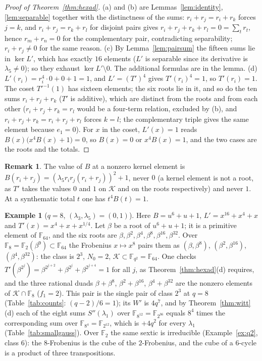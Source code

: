 \documentclass[12pt,a4paper]{amsart}
\theoremstyle{definition}
\newtheorem{remark}[theorem]{Remark}
\newtheorem{example}[theorem]{Example}
\newcommand{\F}{\mathbb{F}}
\newcommand{\Kk}{\mathcal{K}}
\newcommand{\Spp}{S''}
\begin{document}
\begin{proof}[Proof of Theorem~\ref{thm:hexad}]
(a) and (b) are Lemmas~\ref{lem:identity}, \ref{lem:separable} together with the distinctness of the sums: $r_i+r_j=r_i+r_k$ forces $j=k$, and $r_i+r_j=r_k+r_l$ for disjoint pairs gives $r_i+r_j+r_k+r_l=0=\sum_tr_t$, hence $r_m+r_n=0$ for the complementary pair, contradicting separability; $r_i+r_j\ne0$ for the same reason. (c) By Lemma~\ref{lem:pairsum} the fifteen sums lie in $\ker L'$, which has exactly $16$ elements ($L'$ is separable since its derivative is $\lambda_5\ne0$); so they exhaust $\ker L'\setminus0$. The additional formulas are in the lemma. (d) $L'(r_i)=r_i^4\cdot0+0+1=1$, and $L'=(T')^4$ gives $T'(r_i)^4=1$, so $T'(r_i)=1$. The coset $T'^{-1}(1)$ has sixteen elements; the six roots lie in it, and so do the ten sums $r_i+r_j+r_k$ ($T'$ is additive), which are distinct from the roots and from each other ($r_i+r_j+r_k=r_l$ would be a four-term relation, excluded by (b), and $r_i+r_j+r_k=r_i+r_j+r_l$ forces $k=l$; the complementary triple gives the same element because $e_1=0$). For $x$ in the coset, $L'(x)=1$ reads $B(x)\bigl(x^4B(x)+1\bigr)=0$, so $B(x)=0$ or $x^4B(x)=1$, and the two cases are the roots and the totals.
\end{proof}

\begin{remark}
The value of $B$ at a nonzero kernel element is $B(r_i+r_j)=(\lambda_5r_ir_j(r_i+r_j))^2+1$, never $0$ (a kernel element is not a root, as $T'$ takes the values $0$ and $1$ on $\Kk$ and on the roots respectively) and never $1$. At a synthematic total $t$ one has $t^4B(t)=1$.
\end{remark}

\begin{example}[$q=8$, $(\lambda_3,\lambda_5)=(0,1)$]\label{ex:q8}
Here $B=u^6+u+1$, $L'=x^{16}+x^4+x$ and $T'(x)=x^4+x+x^{1/4}$. Let $\beta$ be a root of $u^6+u+1$; it is a primitive element of $\F_{64}$, and the six roots are $\beta,\beta^2,\beta^4,\beta^8,\beta^{16},\beta^{32}$. Over $\F_8=\F_2(\beta^9)\subset\F_{64}$ the Frobenius $x\mapsto x^8$ pairs them as $(\beta,\beta^8)$, $(\beta^2,\beta^{16})$, $(\beta^4,\beta^{32})$: the class is $2^3$, $N_0=2$, $\Kk\subset\F_{q^2}=\F_{64}$. One checks $T'(\beta^{2^j})=\beta^{2^{j+2}}+\beta^{2^j}+\beta^{2^{j+4}}=1$ for all $j$, as Theorem~\ref{thm:hexad}(d) requires, and the three rational duads $\beta+\beta^8$, $\beta^2+\beta^{16}$, $\beta^4+\beta^{32}$ are the nonzero elements of $\Kk\cap\F_8$ ($f_1=2$). This pair is the single pair of class $2^3$ at $q=8$ (Table~\ref{tab:counts}: $(q-2)/6=1$); its $W'$ is $4q^7$, and by Theorem~\ref{thm:witt}(d) each of the eight sums $\Spp(\lambda_1)$ over $\F_{8^{12}}=\F_{2^{36}}$ equals $8^4$ times the corresponding sum over $\F_{8^4}=\F_{2^{12}}$, which is $+4q^2$ for every $\lambda_1$ (Table~\ref{tab:smallgauss}). Over $\F_2$ the same sextic is irreducible (Example~\ref{ex:q2}, class $6$): the $8$-Frobenius is the cube of the $2$-Frobenius, and the cube of a $6$-cycle is a product of three transpositions.
\end{example}
\end{document}
